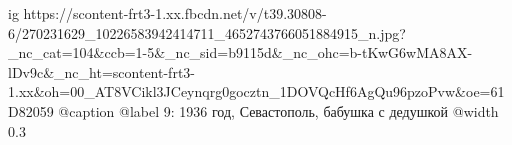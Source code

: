  
 
 
 
 

\ifcmt
  ig https://scontent-frt3-1.xx.fbcdn.net/v/t39.30808-6/270231629_10226583942414711_4652743766051884915_n.jpg?_nc_cat=104&ccb=1-5&_nc_sid=b9115d&_nc_ohc=b-tKwG6wMA8AX-lDv9c&_nc_ht=scontent-frt3-1.xx&oh=00_AT8VCikl3JCeynqrg0gocztn_1DOVQcHf6AgQu96pzoPvw&oe=61D82059
	@caption @label 9: 1936 год, Севастополь, бабушка с дедушкой
  @width 0.3
\fi
